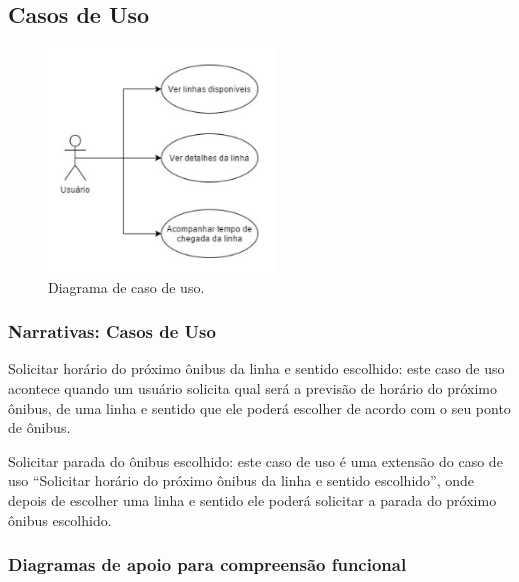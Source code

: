 \documentclass[
	12pt,				%
	oneside,			%
	a4paper,			%
	brazil				%
]{abntex2}
\begin{document}
{\newpage

\subsection{Casos de Uso}

\begin{figure}[!h]
\centering
\includegraphics[width=6cm, center]{images/use-case-diagram.png}
\caption{Diagrama de caso de uso.}
\label{Rotulo}
\end{figure}

\subsubsection{Narrativas: Casos de Uso}

Solicitar horário do próximo ônibus da linha e sentido escolhido: este caso de uso acontece quando um usuário solicita qual será a previsão de horário do próximo ônibus, de uma linha e sentido que ele poderá escolher de acordo com o seu ponto de ônibus.

Solicitar parada do ônibus escolhido: este caso de uso é uma extensão do caso de uso “Solicitar horário do próximo ônibus da linha e sentido escolhido”, onde depois de escolher uma linha e sentido ele poderá solicitar a parada do próximo ônibus escolhido.

\newpage

\subsubsection{Diagramas de apoio para compreensão funcional}

}
\end{document}
